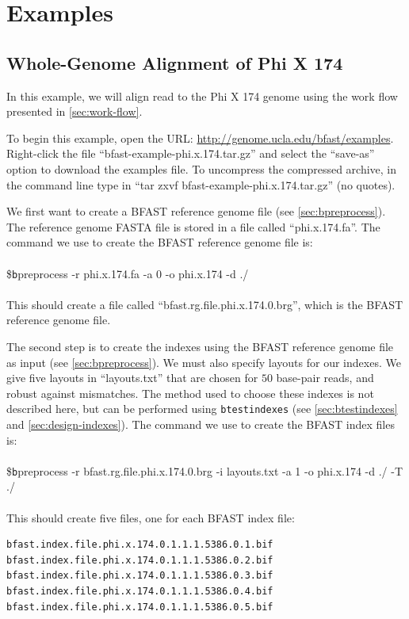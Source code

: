 \documentclass[a4paper,12pt]{book}
\newcommand{\TT}[1]{{\tt #1}} %
\newenvironment{script}{\\\\\footnotesize\$\TT}{\normalsize\\\\}
\newcommand{\rGFF}{reference genome FASTA file}
\newcommand{\BRGF}{BFAST reference genome file} %
\newcommand{\BIF}{BFAST index file} %
\begin{document}
\chapter{Examples}
\section{Whole-Genome Alignment of Phi X 174}
\label{sec:phi}
In this example, we will align read to the Phi X 174 genome using the work flow presented in \autoref{sec:work-flow}.

To begin this example, open the URL: \url{http://genome.ucla.edu/bfast/examples}.
Right-click the file ``bfast-example-phi.x.174.tar.gz'' and select the ``save-as'' option to download the examples file.
To uncompress the compressed archive, in the command line type in ``tar zxvf bfast-example-phi.x.174.tar.gz'' (no quotes).

We first want to create a \BRGF{} (see \autoref{sec:bpreprocess}).
The \rGFF{} is stored in a file called ``phi.x.174.fa''.
The command we use to create the \BRGF{} is:
\begin{script}
	bpreprocess -r phi.x.174.fa -a 0 -o phi.x.174 -d ./
\end{script}
This should create a file called ``bfast.rg.file.phi.x.174.0.brg'', which is the \BRGF{}.

The second step is to create the indexes using the \BRGF{} as input (see \autoref{sec:bpreprocess}).
We must also specify layouts for our indexes.
We give five layouts in ``layouts.txt'' that are chosen for $50$ base-pair reads, and robust against mismatches.
The method used to choose these indexes is not described here, but can be performed using \TT{btestindexes} (see \autoref{sec:btestindexes} and \autoref{sec:design-indexes}).
The command we use to create the \BIF{s} is:
\begin{script}
	bpreprocess -r bfast.rg.file.phi.x.174.0.brg -i layouts.txt -a 1 -o phi.x.174 -d ./ -T ./
\end{script}
This should create five files, one for each \BIF{}:
\begin{verbatim}
bfast.index.file.phi.x.174.0.1.1.1.5386.0.1.bif
bfast.index.file.phi.x.174.0.1.1.1.5386.0.2.bif
bfast.index.file.phi.x.174.0.1.1.1.5386.0.3.bif
bfast.index.file.phi.x.174.0.1.1.1.5386.0.4.bif
bfast.index.file.phi.x.174.0.1.1.1.5386.0.5.bif
\end{verbatim}
\end{document}
